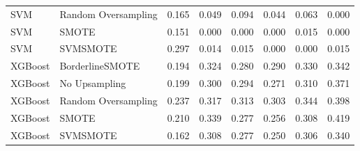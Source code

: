 \begin{tabular}{llllllll}
                         SVM & Random Oversampling & 0.165 &                     0.049 &                 0.094 &                  0.044 &                                   0.063 &     0.000 \\
                         SVM &               SMOTE & 0.151 &                     0.000 &                 0.000 &                  0.000 &                                   0.015 &     0.000 \\
                         SVM &            SVMSMOTE & 0.297 &                     0.014 &                 0.015 &                  0.000 &                                   0.000 &     0.015 \\
                     XGBoost &     BorderlineSMOTE & 0.194 &                     0.324 &                 0.280 &                  0.290 &                                   0.330 &     0.342 \\
                     XGBoost &       No Upsampling & 0.199 &                     0.300 &                 0.294 &                  0.271 &                                   0.310 &     0.371 \\
                     XGBoost & Random Oversampling & 0.237 &                     0.317 &                 0.313 &                  0.303 &                                   0.344 &     0.398 \\
                     XGBoost &               SMOTE & 0.210 &                     0.339 &                 0.277 &                  0.256 &                                   0.308 &     0.419 \\
                     XGBoost &            SVMSMOTE & 0.162 &                     0.308 &                 0.277 &                  0.250 &                                   0.306 &     0.340 \\
\bottomrule
\end{tabular}
